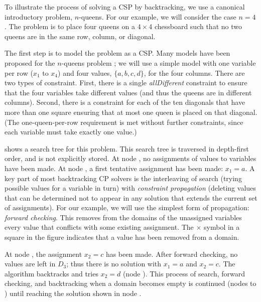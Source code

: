 To illustrate the process of solving a CSP by backtracking, we use a canonical
introductory problem, $n$-queens. For our example, we will consider the case
$n=4$. The problem is to place four queens on a $4 \times 4$ chessboard such
that no two queens are in the same row, column, or diagonal.

The first step is to model the problem as a CSP. Many models have been proposed
for the $n$-queens problem \citep{DBLP:reference/fai/Smith06}; we will use a
simple model with one variable per row ($x_1$ to $x_4$) and four values, $\{a, b, c, d\}$, for
the four columns.  There are two types of constraint. First, there is a single
\emph{allDifferent} constraint to ensure that the four variables take different
values (and thus the queens are in different columns). Second, there is a
constraint for each of the ten diagonals that have more than one square
ensuring that at most one queen is placed on that diagonal.
(The one-queen-per-row requirement is met without further constraints,
since each variable must take exactly one value.)

 shows a search tree for this problem.
This search tree is traversed in depth-first order, and is not explicitly
stored.
At node ,
no assignments of values to variables have been made. At node , a first
tentative assignment has been made: $x_1=a$. A key part of most backtracking CP
solvers is the interleaving of search (trying possible values for a variable
in turn) with \emph{constraint propagation} (deleting values that can be
determined not to appear in any solution that extends the current set of
assignments). For our example, we will use the simplest form of propagation:
\emph{forward checking}. This removes from the domains of the unassigned variables
every value that conflicts with some existing assignment. The $\times$ symbol
in a square in the figure indicates that a value has been removed from a domain.

At node , the assignment $x_2=c$ has been made. After forward checking, no
values are left in $D_3$; thus there is no solution with $x_1=a$ and $x_2=c$.
The algorithm backtracks and tries $x_2=d$
(node ). This process of search, forward checking, and backtracking when
a domain becomes empty is continued (nodes  to ) until reaching the solution
shown in node .

